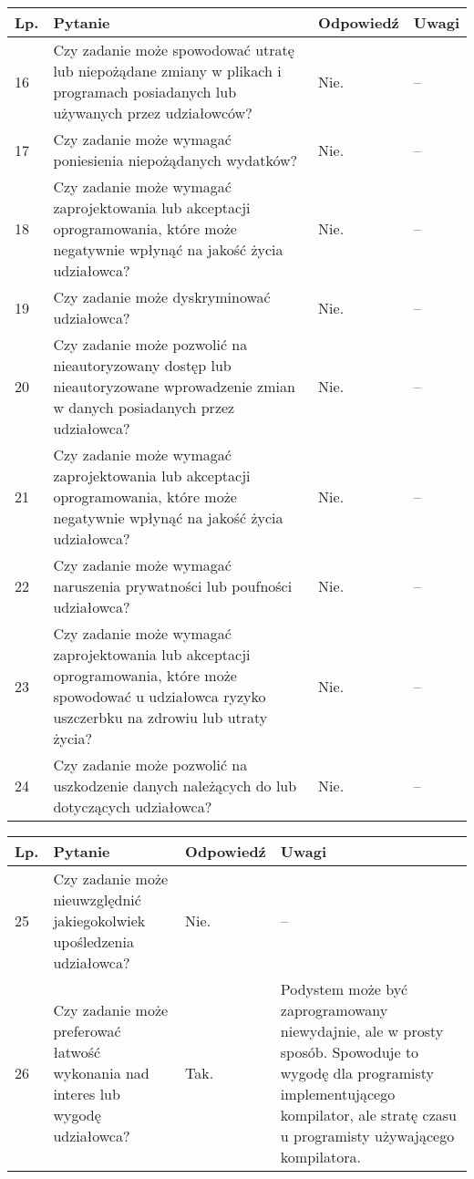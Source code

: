 \documentclass[11pt,oneside,a4paper,titlepage,onecolumn]{article}
\begin{document}
\begin{tabularx}{\textwidth}{|l|X|l|X|}
    \hline
    Lp. & Pytanie & Odpowiedź & Uwagi \\ \hline
    
	16
	& Czy zadanie może spowodować utratę lub niepożądane zmiany w plikach i
    programach posiadanych lub używanych przez udziałowców?
	& Nie.
	& --
	\\\hline
	
	17
	& Czy zadanie może wymagać poniesienia niepożądanych wydatków?
	& Nie.
	& --
	\\\hline
	
	18
	& Czy zadanie może wymagać zaprojektowania lub akceptacji oprogramowania,
    które może negatywnie wpłynąć na jakość życia udziałowca?
	& Nie.
	& --
	\\\hline
	
	19
	& Czy zadanie może dyskryminować udziałowca?
	& Nie.
	& --
	\\\hline
	
	20
	& Czy zadanie może pozwolić na nieautoryzowany dostęp lub nieautoryzowane
    wprowadzenie zmian w danych posiadanych przez udziałowca?
	& Nie.
	& --
	\\\hline
	
	21
	& Czy zadanie może wymagać zaprojektowania lub akceptacji oprogramowania,
    które może negatywnie wpłynąć na jakość życia udziałowca?
	& Nie.
	& --
	\\\hline
	
	22
	& Czy zadanie może wymagać naruszenia prywatności lub poufności udziałowca?
	& Nie.
	& --
	\\\hline
	
	23
	& Czy zadanie może wymagać zaprojektowania lub akceptacji oprogramowania,
    które może spowodować u udziałowca ryzyko uszczerbku na zdrowiu lub utraty
    życia?
	& Nie.
	& --
	\\\hline
	
	24
	& Czy zadanie może pozwolić na uszkodzenie danych należących do lub
    dotyczących udziałowca?
	& Nie.
	& --
	\\\hline
\end{tabularx}

\begin{tabularx}{\textwidth}{|l|X|l|X|}
    \hline
    Lp. & Pytanie & Odpowiedź & Uwagi \\ \hline
    
	25
	& Czy zadanie może nieuwzględnić jakiegokolwiek upośledzenia udziałowca?
	& Nie.
	& --
	\\\hline
    
	26
	& Czy zadanie może preferować łatwość wykonania nad interes lub wygodę
    udziałowca?
	& Tak.
	& Podystem może być zaprogramowany niewydajnie, ale w prosty sposób.
    Spowoduje to wygodę dla programisty implementującego kompilator, ale
    stratę czasu u programisty używającego kompilatora.
	\\\hline
\end{tabularx}
\end{document}
